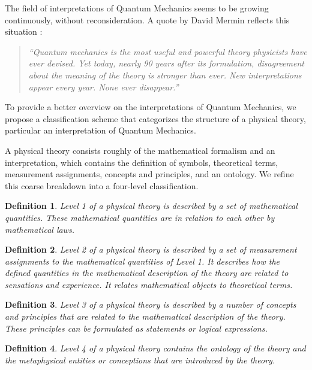 \documentclass{article}
\newtheorem{mydef}{Definition} %
\begin{document}
The field of interpretations of Quantum Mechanics seems to be growing continuously, without reconsideration. A quote by David Mermin reflects this situation \cite[]{mermin2012commentary}: 

\begin{quote}
\textit{``Quantum mechanics is the most useful and powerful theory physicists have ever devised. Yet today, nearly 90 years after its formulation, disagreement about the meaning of the theory is stronger than ever. New interpretations appear every year. None ever disappear.''}
\end{quote}

To provide a better overview on the interpretations of Quantum Mechanics, we propose a classification scheme that categorizes the structure of a physical theory, particular an interpretation of Quantum Mechanics.

A physical theory consists roughly of the mathematical formalism and an interpretation, which contains the definition of symbols, theoretical terms, measurement assignments, concepts and principles, and an ontology. We refine this coarse breakdown into a four-level classification.

\begin{mydef}
Level 1 of a physical theory is described by a set of mathematical quantities. These mathematical quantities are in relation to each other by mathematical laws. 
\end{mydef}

\begin{mydef}
Level 2 of a physical theory is described by a set of measurement assignments to the mathematical quantities of Level 1. It describes how the defined quantities in the mathematical description of the theory are related to sensations and experience. It relates mathematical objects to theoretical terms.  
\end{mydef}


\begin{mydef}
Level 3 of a physical theory is described by a number of concepts and principles that are related to the mathematical description of the theory. These principles can be formulated as statements or logical expressions.
\end{mydef}

\begin{mydef}
Level 4 of a physical theory contains the ontology of the theory and the metaphysical entities or conceptions that are introduced by the theory. 
\end{mydef}
\end{document}
